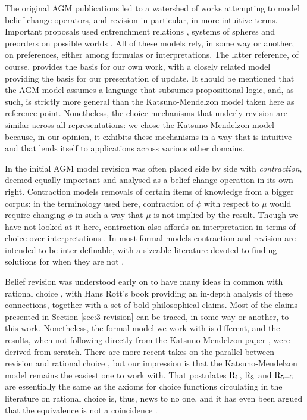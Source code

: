 The original AGM publications led to a watershed of works attempting 
to model belief change operators, and revision in particular, in 
more intuitive terms. Important proposals used 
entrenchment relations \cite{GardenforsM88},
systems of spheres \cite{Grove88}
and preorders on possible worlds \cite{KatsunoM92}.
All of these models rely, in some way or another, on 
preferences, either among formulas or interpretations.
The latter reference, of course, provides the basis for our own work,
with a closely related model \cite{KatsunoM91} providing the basis 
for our presentation of update.
It should be mentioned that the AGM model assumes a language 
that subsumes propositional logic, and, as such, is strictly more general 
than the Katsuno-Mendelzon model taken here as reference point. 
Nonetheless, the choice mechanisms that underly revision 
are similar across all representations:
we chose the Katsuno-Mendelzon model 
because, in our opinion, it exhibits these mechanisms in a way that is
intuitive and that lends itself to applications across various other domains.

In the initial AGM model revision was often placed side by side 
with \emph{contraction}, deemed equally important and analysed as a belief 
change operation in its own right. 
Contraction models removals of certain items of knowledge from a bigger corpus:
in the terminology used here, contraction of $\phi$ with respect to $\mu$
would require changing $\phi$ in such a way that $\mu$ is not implied by the result.
Though we have not looked at it here, contraction also
affords an interpretation in terms of choice over interpretations \cite{CaridroitKM17}.
In most formal models contraction and revision are intended to be
inter-definable, with a sizeable literature devoted to finding solutions 
for when they are not \cite{Delgrande08,DelgrandeW10,DelgrandeW13,ZhuangPZ13,ZhuangPZ17}.

Belief revision was understood early on to have many ideas in common
with rational choice \cite{Doyle91,Rott93,Schulte99}, with Hans Rott's book \cite{Rott01}
providing an in-depth analysis of these connections, together with a set of 
bold philosophical claims. Most of the claims presented in Section \ref{sec:3-revision}
can be traced, in some way or another, to this work. Nonetheless, the formal model 
we work with is different, and the results, when not following directly 
from the Katsuno-Mendelzon paper \cite{KatsunoM92}, were derived from scratch.
There are more recent takes on the parallel between revision and rational choice 
\cite{Bonanno09,Arlo-CostaP10,Hansson14}, but our impression is that the Katsuno-Mendelzon model
remains the easiest one to work with. That postulates $\mathrm{R}_{1}$, $\mathrm{R}_{3}$ and $\mathrm{R}_{5-6}$
are essentially the same as the axioms for choice functions circulating in the 
literature on rational choice is, thus, news to no one, and it has even been argued that 
the equivalence is not a coincidence \cite{Olsson03}.

